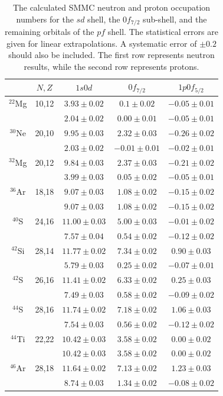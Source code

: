 \documentclass{article}
\begin{document}
\begin{table}[hbtp]
\begin{center}
\caption{The calculated SMMC neutron and
proton occupation numbers for the $sd$ shell, the
$0f_{7/2}$ sub-shell, and the remaining orbitals of the
$pf$ shell.  The statistical errors are given for linear
extrapolations. A systematic error of $\pm 0.2$ should also
be included. The first row represents neutron results, while the
second row represents protons.}
\begin{tabular}{|ccccc|}\hline
 & $N,Z$ & $1s0d$ & $0f_{7/2}$ & $1p0f_{5/2}$\\ \hline
$^{22}$Mg & 10,12 & $3.93 \pm 0.02$ & $0.1 \pm  0.02$ &
  $-0.05 \pm 0.01$ \\ &&  $2.04 \pm 0.02$ & $0.00 \pm 0.01$ &
  $-0.05 \pm 0.01$ \\
$^{30}$Ne & 20,10 & $9.95 \pm 0.03$ & $2.32 \pm 0.03$ &
  $-0.26 \pm 0.02$ \\ && $2.03 \pm 0.02$ & $-0.01 \pm 0.01$ &
  $-0.02 \pm 0.01$ \\
$^{32}$Mg & 20,12 & $9.84 \pm 0.03$ & $ 2.37 \pm 0.03$ &
  $-0.21 \pm 0.02$ \\ && $3.99 \pm 0.03$ & $0.05 \pm 0.02$ &
  $-0.05 \pm 0.01$ \\
$^{36}$Ar & 18,18 & $9.07 \pm 0.03$ & $1.08 \pm 0.02$ &
  $-0.15 \pm 0.02$ \\ && $9.07 \pm 0.03$ & $1.08 \pm 0.02$ &
  $-0.15 \pm 0.02$ \\
$^{40}$S & 24,16 & $11.00 \pm 0.03$ & $ 5.00 \pm 0.03 $ &
  $-0.01\pm 0.02$ \\ && $7.57 \pm 0.04$ & $0.54 \pm 0.02$ &
  $-0.12 \pm 0.02$ \\
$^{42}$Si & 28,14 & $11.77 \pm 0.02$ & $7.34 \pm 0.02$ &
  $0.90 \pm 0.03$ \\ && $5.79 \pm 0.03$ & $0.25 \pm 0.02$ &
  $-0.07 \pm 0.01$ \\
$^{42}$S & 26,16 & $11.41 \pm 0.02$ & $6.33 \pm 0.02$ &
  $0.25 \pm 0.03$ \\ && $7.49 \pm 0.03$ & $0.58 \pm 0.02$ &
  $-0.09 \pm 0.02$ \\
$^{44}$S & 28,16 & $11.74 \pm 0.02$ & $7.18 \pm 0.02$ &
  $1.06 \pm 0.03$ \\ && $7.54 \pm 0.03$ & $0.56 \pm 0.02$ &
  $-0.12 \pm 0.02$ \\
$^{44}$Ti & 22,22 & $10.42 \pm 0.03$ & $3.58 \pm 0.02$ &
  $0.00 \pm 0.02$\\ & & $10.42 \pm 0.03$ & $3.58 \pm 0.02$ &
  $0.00 \pm 0.02$ \\
$^{46}$Ar & 28,18 & $11.64 \pm 0.02$ & $7.13 \pm 0.02$ &
  $1.23 \pm 0.03$ \\ && $8.74 \pm 0.03$ & $1.34 \pm 0.02$ &
  $-0.08 \pm 0.02$ \\\hline
\end{tabular}
\end{center}
\label{t:tab3}
\end{table}
\end{document}
